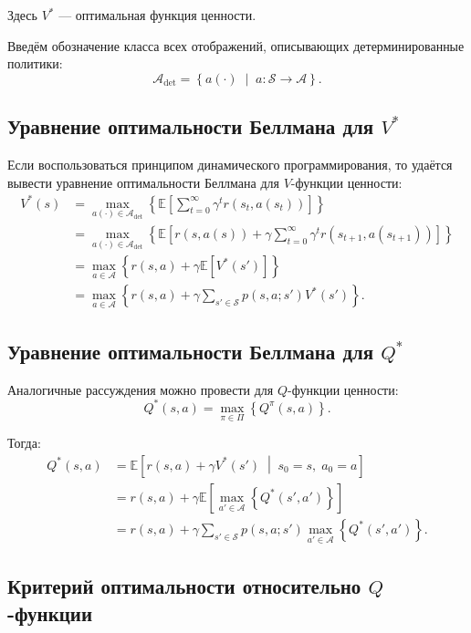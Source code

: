 \documentclass[12pt,a4paper]{article}
\begin{document}
Здесь $V^\ast$ --- оптимальная функция ценности.

Введём обозначение класса всех отображений, описывающих детерминированные политики:
\[
\mathcal A_{\mathrm{det}}
=
\left\{
a(\cdot)
\;\middle|\;
a : \mathcal S \to \mathcal A
\right\}.
\]

\subsection{Уравнение оптимальности Беллмана для $V^\ast$}

Если воспользоваться принципом динамического программирования, то удаётся вывести уравнение оптимальности Беллмана для $V$-функции ценности:
\[
\begin{aligned}
V^\ast(s)
&=
\max_{a(\cdot) \in \mathcal A_{\mathrm{det}}}
\left\{
\mathbb E
\left[
\sum_{t=0}^{\infty}
\gamma^t r(s_t,a(s_t))
\right]
\right\}
\\
&=
\max_{a(\cdot) \in \mathcal A_{\mathrm{det}}}
\left\{
\mathbb E
\left[
r(s,a(s))
+
\gamma
\sum_{t=0}^{\infty}
\gamma^t r(s_{t+1},a(s_{t+1}))
\right]
\right\}
\\
&=
\max_{a \in \mathcal A}
\left\{
r(s,a)
+
\gamma
\mathbb E
\left[
V^\ast(s')
\right]
\right\}
\\
&=
\max_{a \in \mathcal A}
\left\{
r(s,a)
+
\gamma
\sum_{s' \in \mathcal S}
p(s,a;s')V^\ast(s')
\right\}.
\end{aligned}
\]

\subsection{Уравнение оптимальности Беллмана для $Q^\ast$}

Аналогичные рассуждения можно провести для $Q$-функции ценности:
\[
Q^\ast(s,a)
=
\max_{\pi \in \Pi}
\left\{
Q^\pi(s,a)
\right\}.
\]

Тогда:
\[
\begin{aligned}
Q^\ast(s,a)
&=
\mathbb E
\left[
r(s,a)
+
\gamma V^\ast(s')
\;\middle|\;
s_0=s,\; a_0=a
\right]
\\
&=
r(s,a)
+
\gamma
\mathbb E
\left[
\max_{a' \in \mathcal A}
\left\{
Q^\ast(s',a')
\right\}
\right]
\\
&=
r(s,a)
+
\gamma
\sum_{s' \in \mathcal S}
p(s,a;s')
\max_{a' \in \mathcal A}
\left\{
Q^\ast(s',a')
\right\}.
\end{aligned}
\]

\subsection{Критерий оптимальности относительно $Q$-функции}
\end{document}
